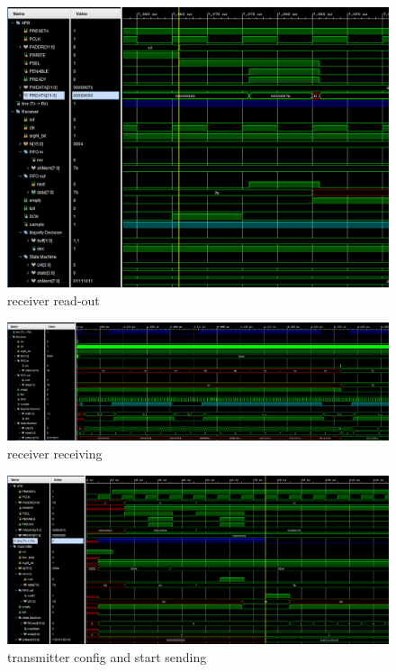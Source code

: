 \begin{figure}[h]
\vspace{0.5cm}
\begin{center}
\includegraphics[width=\textwidth]{figures/sim2.png}
\caption{receiver read-out}
\label{fig:sim2}
\end{center}
\vspace{0.5cm}
\end{figure}


\begin{figure}[h]
\vspace{0.5cm}
\begin{center}
\includegraphics[width=\textwidth]{figures/sim3.png}
\caption{receiver receiving}
\label{fig:sim3}
\end{center}
\vspace{0.5cm}
\end{figure}


\begin{figure}[h]
\vspace{0.5cm}
\begin{center}
\includegraphics[width=\textwidth]{figures/sim4.png}
\caption{transmitter config and start sending}
\label{fig:sim4}
\end{center}
\vspace{0.5cm}
\end{figure}

